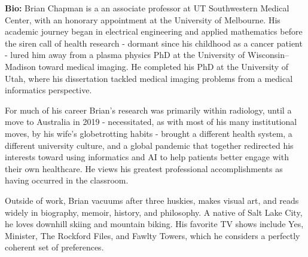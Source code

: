 \documentclass[11pt,oneside]{book}
\begin{document}
    \textbf{Bio:} Brian Chapman is a an associate professor at UT Southwestern Medical Center, with an honorary appointment at the University of Melbourne. His academic journey began in electrical engineering and applied mathematics before the siren call of health research - dormant since his childhood as a cancer patient - lured him away from a plasma physics PhD at the University of Wisconsin–Madison toward medical imaging. He completed his PhD at the University of Utah, where his dissertation tackled medical imaging problems from a medical informatics perspective.
\par\vspace{1em}
For much of his career Brian's research was primarily within radiology, until a move to Australia in 2019 - necessitated, as with most of his many institutional moves, by his wife's globetrotting habits - brought a different health system, a different university culture, and a global pandemic that together redirected his interests toward using informatics and AI to help patients better engage with their own healthcare. He views his greatest professional accomplishments as having occurred in the classroom.
\par\vspace{1em}
Outside of work, Brian vacuums after three huskies, makes visual art, and reads widely in biography, memoir, history, and philosophy. A native of Salt Lake City, he loves downhill skiing and mountain biking. His favorite TV shows include Yes, Minister, The Rockford Files, and Fawlty Towers, which he considers a perfectly coherent set of preferences.
  \newpage
  


\end{document}
